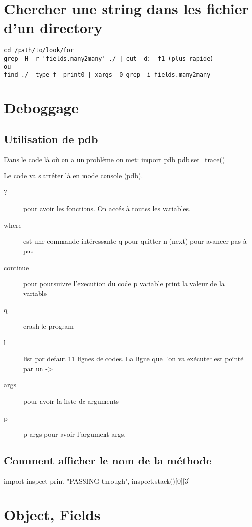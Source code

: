 \documentclass[12pt,a4paper]{article}
\begin{document}
\section{Chercher une string dans les fichier d'un directory}
\label{sec:search_string}

\begin{verbatim}
cd /path/to/look/for
grep -H -r 'fields.many2many' ./ | cut -d: -f1 (plus rapide)
ou
find ./ -type f -print0 | xargs -0 grep -i fields.many2many
\end{verbatim}

\section{Deboggage}
\label{sec:deboggage}

\subsection{Utilisation de pdb}
\label{sec:pdb}

Dans le code là où on a un problème on met:
import pdb
pdb.set\_trace()

Le code va s'arréter là en mode console (pdb).
\begin{description}
\item[?]  pour avoir les fonctions.  On accés à toutes les variables.
\item[where]   est une commande intéressante q pour quitter n (next) pour avancer pas à pas
\item[continue] pour poursuivre l'execution du code p variable print la valeur de la
  variable
\item[q] crash le program
\item[l] list par defaut 11 lignes de codes. La ligne que l'on va exécuter est pointé par un ->
\item[args] pour avoir la liste de arguments
\item[p] p args pour avoir l'argument args. 
\end{description}

\subsection{Comment afficher le nom de la méthode }
\label{sec:stack}
import inspect
print "PASSING through", inspect.stack()[0][3]

\section{Object, Fields}
\label{sec:obj,field}
\end{document}
